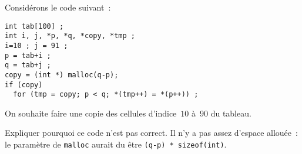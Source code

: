 Consid\'erons le code suivant~:
\begin{verbatim}
int tab[100] ;
int i, j, *p, *q, *copy, *tmp ; 
i=10 ; j = 91 ;
p = tab+i ; 
q = tab+j ; 
copy = (int *) malloc(q-p); 
if (copy) 
  for (tmp = copy; p < q; *(tmp++) = *(p++)) ; 
\end{verbatim}
On souhaite faire une copie des cellules d'indice~$10$ \`a~$90$ du
tableau.
\par
Expliquer pourquoi ce code n'est pas correct.
\ifcorrection
Il n'y a pas assez d'espace allou\'ee~: le param\`etre de
\verb+malloc+ aurait du \^etre \verb+(q-p) * sizeof(int)+. 
\fi
